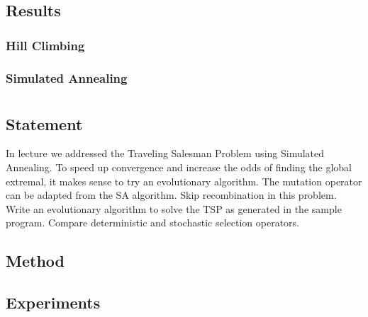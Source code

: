 \documentclass{article}
\begin{document}
\subsection{Results}

\subsubsection{Hill Climbing}

\subsubsection{Simulated Annealing}

\section{}\label{prob:2}
\subsection{Statement}
In lecture we addressed the Traveling Salesman Problem using Simulated Annealing. To speed up
convergence and increase the odds of finding the global extremal, it makes sense to try an
evolutionary algorithm. The mutation operator can be adapted from the SA algorithm. Skip
recombination in this problem. Write an evolutionary algorithm to solve the TSP as generated in the
sample program. Compare deterministic and stochastic selection operators.

\subsection{Method}
\subsection{Experiments}
\end{document}
